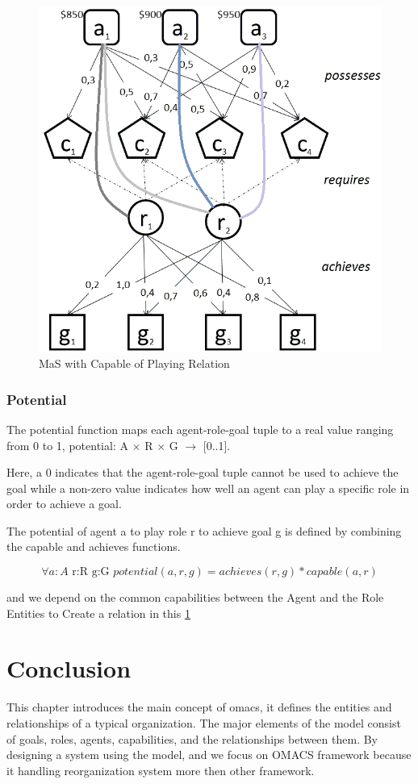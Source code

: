 \begin{figure}[th]
	\centering
		\includegraphics[scale=0.5]{ch1/img/mag}
	\caption{\label{fig:Capable Of playing Relation} MaS with Capable of Playing Relation \cite{omacs0}}
\end{figure}
\pagebreak
\subsubsection{Potential}
The potential function maps each agent-role-goal tuple to a real value ranging from 0 to 1, 
potential: A $\times$ R $\times$ G $\rightarrow$ [0..1]\cite{omacs4}.

Here, a 0 indicates that the agent-role-goal tuple cannot be
used to achieve the goal while a non-zero value indicates how well an agent can play
a specific role in order to achieve a goal. 

The potential of agent a to play role r 
to achieve goal g is defined by combining the capable and achieves functions\cite{omacs4}.

\begin{equation}
\forall a:A \textrm{ r:R g:G } potential(a,r,g) = achieves(r,g)*capable(a,r)\label{eq:potentialFunc}
\end{equation}

and we depend on the common capabilities between the Agent and the Role Entities to Create a relation in this \ref{fig:Capable Of playing Relation} 


\section{Conclusion}
This chapter introduces the main concept of omacs, it defines the entities and relationships of a typical organization. 
The major elements of the model consist of goals, roles, agents, capabilities, and the relationships between them. By designing a system using the model, and we focus on OMACS framework because it handling reorganization system more then other framework.